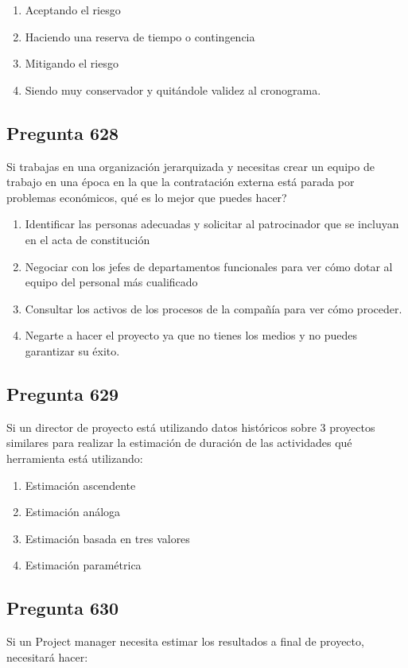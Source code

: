 \documentclass[11pt,a4paper]{article}
\begin{document}
\begin{enumerate}[label=\alph*)]
  \item Aceptando el riesgo
  \item Haciendo una reserva de tiempo o contingencia
  \item Mitigando el riesgo
  \item Siendo muy conservador y quitándole validez al cronograma.
\end{enumerate}

\subsection*{Pregunta 628}
Si trabajas en una organización jerarquizada y necesitas crear un equipo de trabajo en una época en la que la contratación externa está parada por problemas económicos, qué es lo mejor que puedes hacer?

\begin{enumerate}[label=\alph*)]
  \item Identificar las personas adecuadas y solicitar al patrocinador que se incluyan en el acta de constitución
  \item Negociar con los jefes de departamentos funcionales para ver cómo dotar al equipo del personal más cualificado
  \item Consultar los activos de los procesos de la compañía para ver cómo proceder.
  \item Negarte a hacer el proyecto ya que no tienes los medios y no puedes garantizar su éxito.
\end{enumerate}

\subsection*{Pregunta 629}
Si un director de proyecto está utilizando datos históricos sobre 3 proyectos similares para realizar la estimación de duración de las actividades qué herramienta está utilizando:

\begin{enumerate}[label=\alph*)]
  \item Estimación ascendente
  \item Estimación análoga
  \item Estimación basada en tres valores
  \item Estimación paramétrica
\end{enumerate}

\subsection*{Pregunta 630}
Si un Project manager necesita estimar los resultados a final de proyecto, necesitará hacer:
\end{document}

